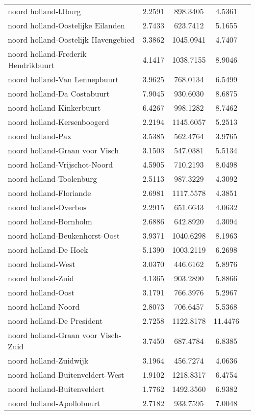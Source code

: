 \begin{longtable}{llccc}
noord holland-IJburg & 2.2591 & 898.3405 & 4.5361 \\
noord holland-Oostelijke Eilanden & 2.7433 & 623.7412 & 5.1655 \\
noord holland-Oostelijk Havengebied & 3.3862 & 1045.0941 & 4.7407 \\
noord holland-Frederik Hendrikbuurt & 4.1417 & 1038.7155 & 8.9046 \\
noord holland-Van Lennepbuurt & 3.9625 & 768.0134 & 6.5499 \\
noord holland-Da Costabuurt & 7.9045 & 930.6030 & 8.6875 \\
noord holland-Kinkerbuurt & 6.4267 & 998.1282 & 8.7462 \\
noord holland-Kersenboogerd & 2.2194 & 1145.6057 & 5.2513 \\
noord holland-Pax & 3.5385 & 562.4764 & 3.9765 \\
noord holland-Graan voor Visch & 3.1503 & 547.0381 & 5.5134 \\
noord holland-Vrijschot-Noord & 4.5905 & 710.2193 & 8.0498 \\
noord holland-Toolenburg & 2.5113 & 987.3229 & 4.3092 \\
noord holland-Floriande & 2.6981 & 1117.5578 & 4.3851 \\
noord holland-Overbos & 2.2915 & 651.6643 & 4.0632 \\
noord holland-Bornholm & 2.6886 & 642.8920 & 4.3094 \\
noord holland-Beukenhorst-Oost & 3.9371 & 1040.6298 & 8.1963 \\
noord holland-De Hoek & 5.1390 & 1003.2119 & 6.2698 \\
noord holland-West & 3.0370 & 446.6162 & 5.8976 \\
noord holland-Zuid & 4.1365 & 903.2890 & 5.8866 \\
noord holland-Oost & 3.1791 & 766.3976 & 5.2967 \\
noord holland-Noord & 2.8073 & 706.6457 & 5.5368 \\
noord holland-De President & 2.7258 & 1122.8178 & 11.4476 \\
noord holland-Graan voor Visch-Zuid & 3.7450 & 687.4784 & 6.8385 \\
noord holland-Zuidwijk & 3.1964 & 456.7274 & 4.0636 \\
noord holland-Buitenveldert-West & 1.9102 & 1218.8317 & 6.4754 \\
noord holland-Buitenveldert & 1.7762 & 1492.3560 & 6.9382 \\
noord holland-Apollobuurt & 2.7182 & 933.7595 & 7.0048 \\

\end{longtable}

